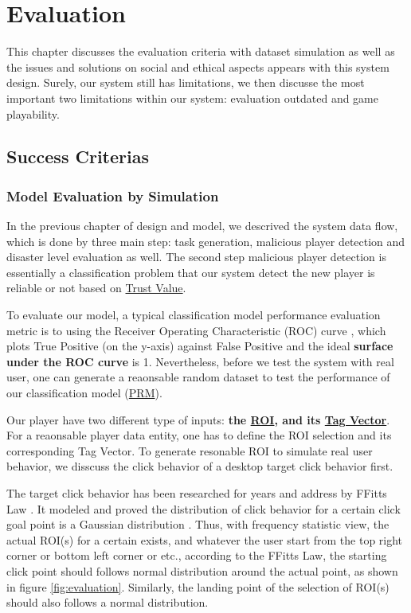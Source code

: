 \section{Evaluation}
\label{chapter:evaluation}

This chapter discusses the evaluation criteria with dataset simulation as well as 
the issues and solutions on social and ethical aspects appears with this system design.
Surely, our system still has limitations, 
we then discusse the most important two limitations within our system: 
evaluation outdated and game playability.

\subsection{Success Criterias}

\subsubsection{Model Evaluation by Simulation}

In the previous chapter of design and model, we descrived the system data flow, which is
done by three main step: task generation, malicious player detection and disaster level evaluation as well.
The second step malicious player detection is essentially a classification problem that 
our system detect the new player is reliable or not based on \hyperref[def:tv]{Trust Value}.

To evaluate our model, a typical classification model performance evaluation metric is to 
using the Receiver Operating Characteristic (ROC) curve \cite{hanley1982meaning}, which 
plots True Positive (on the y-axis) against False Positive and the ideal \textbf{surface under the ROC curve} is 1.
Nevertheless, before we test the system with real user, one can generate a reaonsable random dataset 
to test the performance of our classification model (\hyperref[idx:prm]{PRM}).

Our player have two different type of inputs: \textbf{the \hyperref[def:roi]{ROI}, 
and its \hyperref[def:tagv]{Tag Vector}}. For a reaonsable player data entity, 
one has to define the ROI selection and its corresponding Tag Vector.
To generate resonable ROI to simulate real user behavior, we disscuss the click behavior
of a desktop target click behavior first.

The target click behavior has been researched for years and address by FFitts Law \cite{bi2013ffitts}.
It modeled and proved the distribution of click behavior for a certain click goal point is a Gaussian distribution \cite{goodman1963statistical}.
Thus, with frequency statistic view, the actual ROI(s) for a certain exists, 
and whatever the user start from the top right corner or bottom left corner or etc., 
according to the FFitts Law, the starting click point should follows normal distribution around the actual point,
as shown in figure \ref{fig:evaluation}. Similarly, the landing point of the selection of ROI(s)
should also follows a normal distribution. 

